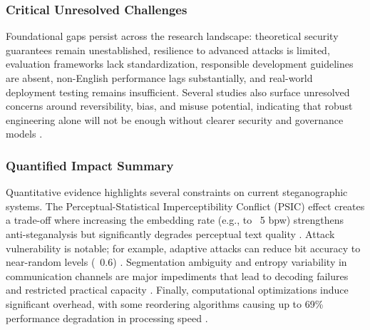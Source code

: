 \subsubsection{Critical Unresolved Challenges}

Foundational gaps persist across the research landscape: theoretical security guarantees remain unestablished, resilience to advanced attacks is limited, evaluation frameworks lack standardization, responsible development guidelines are absent, non-English performance lags substantially, and real-world deployment testing remains insufficient. Several studies also surface unresolved concerns around reversibility, bias, and misuse potential, indicating that robust engineering alone will not be enough without clearer security and governance models \cite{zheng2022general,qiang2023natural,lin2024zero,bender2021dangers}.

\subsubsection{Quantified Impact Summary}

Quantitative evidence highlights several constraints on current steganographic systems. The Perceptual-Statistical Imperceptibility Conflict (PSIC) effect creates a trade-off where increasing the embedding rate (e.g., to ~5 bpw) strengthens anti-steganalysis but significantly degrades perceptual text quality \cite{yang2020vae}. Attack vulnerability is notable; for example, adaptive attacks can reduce bit accuracy to near-random levels (~0.6) \cite{ji2024principled}. Segmentation ambiguity and entropy variability in communication channels are major impediments that lead to decoding failures and restricted practical capacity \cite{kaptchuk2021meteor}. Finally, computational optimizations induce significant overhead, with some reordering algorithms causing up to 69\% performance degradation in processing speed \cite{ding2023discop}.



